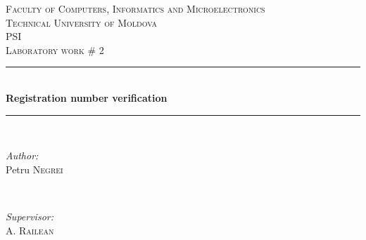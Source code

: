 \documentclass{article}
\begin{document}
  \begin{titlepage}

 \newcommand{\HRule}{\rule{\linewidth}{0.5mm}} %
  \begin{center} %

  \textsc{\Large Faculty of Computers, Informatics and Microelectronics}\\[0.5cm]
  \textsc{\LARGE Technical University of Moldova}\\[1.2cm] %
  \vspace{25 mm}
  \textsc{\Large PSI}\\[0.5cm] %
  \textsc{\large Laboratory work \# 2}\\[0.5cm] %

  \vspace{10 mm}
  \HRule \\[0.4cm]
  { \LARGE \bfseries Registration number verification }\\[0.4cm] %
  \HRule \\[1.5cm]

  \vspace{40mm}

  \begin{minipage}{0.4\textwidth}
  \begin{flushleft} \large
  \emph{Author:}\\
  Petru \textsc{Negrei} %
  \end{flushleft}
  \end{minipage}
  ~
  \begin{minipage}{0.4\textwidth}
  \begin{flushright} \large
  \emph{Supervisor:} \\
  A. \textsc{Railean} %
  \end{flushright}
  \end{minipage}\\[4cm]


\end{center}
\end{titlepage}
\end{document}
